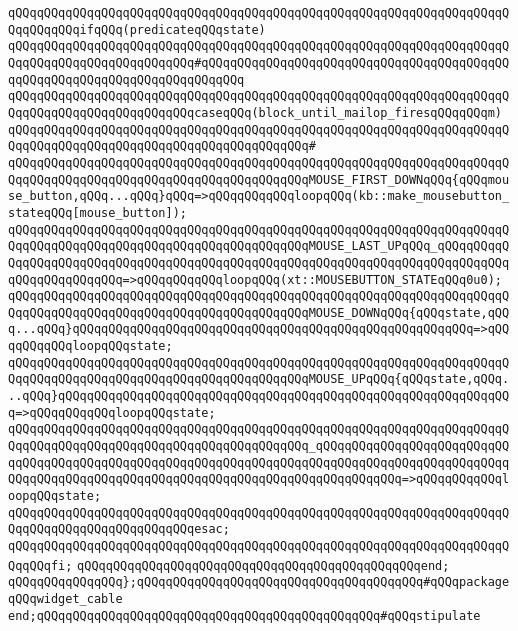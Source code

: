 \verb|qQQqqQQqqQQqqQQqqQQqqQQqqQQqqQQqqQQqqQQqqQQqqQQqqQQqqQQqqQQqqQQqqQQqqQQqqQQqqQQqifqQQq(predicateqQQqstate)|\newline
\verb|qQQqqQQqqQQqqQQqqQQqqQQqqQQqqQQqqQQqqQQqqQQqqQQqqQQqqQQqqQQqqQQqqQQqqQQqqQQqqQQqqQQqqQQqqQQqqQQq#qQQqqQQqqQQqqQQqqQQqqQQqqQQqqQQqqQQqqQQqqQQqqQQqqQQqqQQqqQQqqQQqqQQqqQQqqQQq|\newline
\verb|qQQqqQQqqQQqqQQqqQQqqQQqqQQqqQQqqQQqqQQqqQQqqQQqqQQqqQQqqQQqqQQqqQQqqQQqqQQqqQQqqQQqqQQqqQQqqQQqcaseqQQq(block_until_mailop_firesqQQqqQQqm)|\newline
\verb|qQQqqQQqqQQqqQQqqQQqqQQqqQQqqQQqqQQqqQQqqQQqqQQqqQQqqQQqqQQqqQQqqQQqqQQqqQQqqQQqqQQqqQQqqQQqqQQqqQQqqQQqqQQqqQQq#|\newline
\verb|qQQqqQQqqQQqqQQqqQQqqQQqqQQqqQQqqQQqqQQqqQQqqQQqqQQqqQQqqQQqqQQqqQQqqQQqqQQqqQQqqQQqqQQqqQQqqQQqqQQqqQQqqQQqqQQqMOUSE_FIRST_DOWNqQQq{qQQqmouse_button,qQQq...qQQq}qQQq=>qQQqqQQqqQQqloopqQQq(kb::make_mousebutton_stateqQQq[mouse_button]);|\newline
\verb|qQQqqQQqqQQqqQQqqQQqqQQqqQQqqQQqqQQqqQQqqQQqqQQqqQQqqQQqqQQqqQQqqQQqqQQqqQQqqQQqqQQqqQQqqQQqqQQqqQQqqQQqqQQqqQQqMOUSE_LAST_UPqQQq_qQQqqQQqqQQqqQQqqQQqqQQqqQQqqQQqqQQqqQQqqQQqqQQqqQQqqQQqqQQqqQQqqQQqqQQqqQQqqQQqqQQqqQQqqQQqqQQq=>qQQqqQQqqQQqloopqQQq(xt::MOUSEBUTTON_STATEqQQq0u0);|\newline
\verb|qQQqqQQqqQQqqQQqqQQqqQQqqQQqqQQqqQQqqQQqqQQqqQQqqQQqqQQqqQQqqQQqqQQqqQQqqQQqqQQqqQQqqQQqqQQqqQQqqQQqqQQqqQQqqQQqMOUSE_DOWNqQQq{qQQqstate,qQQq...qQQq}qQQqqQQqqQQqqQQqqQQqqQQqqQQqqQQqqQQqqQQqqQQqqQQqqQQqqQQq=>qQQqqQQqqQQqloopqQQqstate;|\newline
\verb|qQQqqQQqqQQqqQQqqQQqqQQqqQQqqQQqqQQqqQQqqQQqqQQqqQQqqQQqqQQqqQQqqQQqqQQqqQQqqQQqqQQqqQQqqQQqqQQqqQQqqQQqqQQqqQQqMOUSE_UPqQQq{qQQqstate,qQQq...qQQq}qQQqqQQqqQQqqQQqqQQqqQQqqQQqqQQqqQQqqQQqqQQqqQQqqQQqqQQqqQQqqQQq=>qQQqqQQqqQQqloopqQQqstate;|\newline
\verb|qQQqqQQqqQQqqQQqqQQqqQQqqQQqqQQqqQQqqQQqqQQqqQQqqQQqqQQqqQQqqQQqqQQqqQQqqQQqqQQqqQQqqQQqqQQqqQQqqQQqqQQqqQQqqQQq_qQQqqQQqqQQqqQQqqQQqqQQqqQQqqQQqqQQqqQQqqQQqqQQqqQQqqQQqqQQqqQQqqQQqqQQqqQQqqQQqqQQqqQQqqQQqqQQqqQQqqQQqqQQqqQQqqQQqqQQqqQQqqQQqqQQqqQQqqQQqqQQqqQQqqQQq=>qQQqqQQqqQQqloopqQQqstate;|\newline
\verb|qQQqqQQqqQQqqQQqqQQqqQQqqQQqqQQqqQQqqQQqqQQqqQQqqQQqqQQqqQQqqQQqqQQqqQQqqQQqqQQqqQQqqQQqqQQqqQQqesac;|\newline
\verb|qQQqqQQqqQQqqQQqqQQqqQQqqQQqqQQqqQQqqQQqqQQqqQQqqQQqqQQqqQQqqQQqqQQqqQQqqQQqfi;|\newline
\newline
\verb|qQQqqQQqqQQqqQQqqQQqqQQqqQQqqQQqqQQqqQQqqQQqqQQqend;|\newline
\verb|qQQqqQQqqQQqqQQq};qQQqqQQqqQQqqQQqqQQqqQQqqQQqqQQqqQQqqQQq#qQQqpackageqQQqwidget_cable|\newline
\verb|end;qQQqqQQqqQQqqQQqqQQqqQQqqQQqqQQqqQQqqQQqqQQqqQQq#qQQqstipulate|\newline
\newline

